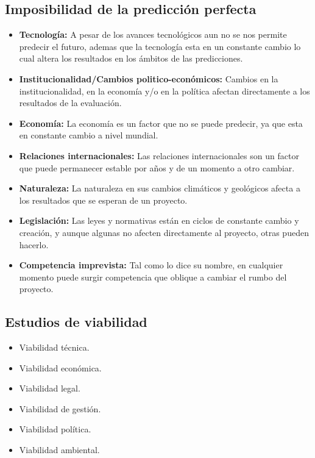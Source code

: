 \documentclass{templateNote}
\begin{document}
\subsection*{Imposibilidad de la predicción perfecta}
\begin{itemize}
    \item \textbf{Tecnología:} A pesar de los avances tecnológicos aun no se nos permite predecir el futuro, ademas que la tecnología esta en un constante cambio lo cual altera los resultados en los ámbitos de las predicciones.
    \item \textbf{Institucionalidad/Cambios politico-económicos:} Cambios en la institucionalidad, en la economía y/o en la política afectan directamente a los resultados de la evaluación.
    \item \textbf{Economía:} La economía es un factor que no se puede predecir, ya que esta en constante cambio a nivel mundial.
    \item \textbf{Relaciones internacionales:} Las relaciones internacionales son un factor que puede permanecer estable por años y de un momento a otro cambiar.
    \item \textbf{Naturaleza:} La naturaleza en sus cambios climáticos y geológicos afecta a los resultados que se esperan de un proyecto.
    \item \textbf{Legislación:} Las leyes y normativas están en ciclos de constante cambio y creación, y aunque algunas no afecten directamente al proyecto, otras pueden hacerlo.
    \item \textbf{Competencia imprevista:} Tal como lo dice su nombre, en cualquier momento puede surgir competencia que oblique a cambiar el rumbo del proyecto.
\end{itemize}

\subsection*{Estudios de viabilidad}
\begin{itemize}
    \item Viabilidad técnica.
    \item Viabilidad económica.
    \item Viabilidad legal.
    \item Viabilidad de gestión.
    \item Viabilidad política.
    \item Viabilidad ambiental.
\end{itemize}
\end{document}
